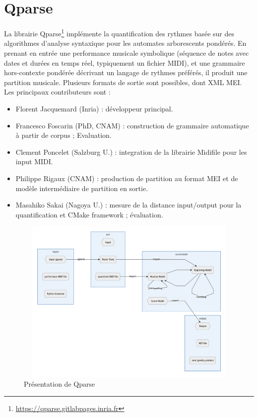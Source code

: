 \section{Qparse}
La librairie Qparse\footnote{\url{https://qparse.gitlabpages.inria.fr}} implémente la quantification des rythmes basée sur des algorithmes d'analyse syntaxique pour les automates arborescents pondérés. En prenant en entrée une performance musicale symbolique (séquence de notes avec dates et durées en temps réel, typiquement un fichier MIDI), et une grammaire hors-contexte pondérée décrivant un langage de rythmes préférés, il produit une partition musicale. Plusieurs formats de sortie sont possibles, dont XML MEI.
Les principaux contributeurs sont :
\begin{itemize}
	\item Florent Jacquemard (Inria) : développeur principal.
	\item Francesco Foscarin (PhD, CNAM) : construction de grammaire automatique à partir de corpus ; Evaluation.
	\item Clement Poncelet (Salzburg U.) : integration de la librairie Midifile pour les input MIDI.
	\item Philippe Rigaux (CNAM) : production de partition au format MEI et de modèle intermédiaire de partition en sortie.
	\item Masahiko Sakai (Nagoya U.) : mesure de la distance input/output pour la quantification et CMake framework ; évaluation.
\end{itemize}
\begin{figure}[h]
	\centering
	\includegraphics[height=80mm, width=130mm]{z_images/3_methodes/1_qparse/0_general_qparse.png}
	\caption{Présentation de Qparse}
	\label{presentation_qparse}
\end{figure}\newpage
